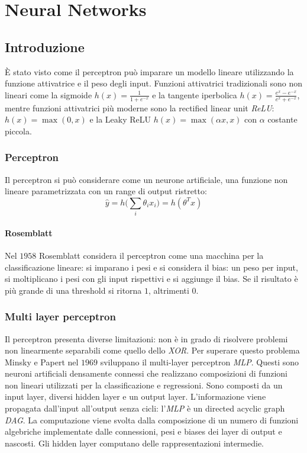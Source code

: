 \chapter{Neural Networks}

\section{Introduzione}
\`E stato visto come il perceptron pu\`o imparare un modello lineare utilizzando la funzione attivatrice e il peso degli input.
Funzioni attivatrici tradizionali sono non lineari come la sigmoide $h(x) = \frac{1}{1+e^{-x}}$ e la tangente iperbolica $h(x) = \frac{e^x-e^{-x}}{e^x+e^{-x}}$, mentre funzioni attivatrici pi\`u moderne sono la rectified linear unit \emph{ReLU}: $h(x) = \max(0,x)$ e la Leaky ReLU $h(x) = \max(\alpha x,x)$ con $\alpha$ costante piccola.

	\subsection{Perceptron}
	Il perceptron si pu\`o considerare come un neurone artificiale, una funzione non lineare parametrizzata con un range di output ristretto:
	$$\hat{y} = h\bigl(\sum\limits_i\theta_ix_i\bigr) = h(\theta^Tx)$$

		\subsubsection{Rosemblatt}
		Nel $1958$ Rosemblatt considera il perceptron come una macchina per la classificazione lineare: si imparano i pesi e si considera il bias: un peso per input, si moltiplicano i pesi con gli input rispettivi e si aggiunge il bias.
		Se il risultato \`e pi\`u grande di una threshold si ritorna $1$, altrimenti $0$.

	\subsection{Multi layer perceptron}
	Il perceptron presenta diverse limitazioni: non \`e in grado di risolvere problemi non linearmente separabili come quello dello \emph{XOR}.
	Per superare questo problema Minsky e Papert nel $1969$ sviluppano il multi-layer perceptron \emph{MLP}.
	Questi sono neuroni artificiali densamente connessi che realizzano composizioni di funzioni non lineari utilizzati per la classificazione e regressioni.
	Sono composti da un input layer, diversi hidden layer e un output layer.
	L'informazione viene propagata dall'input all'output senza cicli: l'\emph{MLP} \`e un directed acyclic graph \emph{DAG}.
	La computazione viene svolta dalla composizione di un numero di funzioni algebriche implementate dalle connessioni, pesi e biases dei layer di output e nascosti.
	Gli hidden layer computano delle rappresentazioni intermedie.

